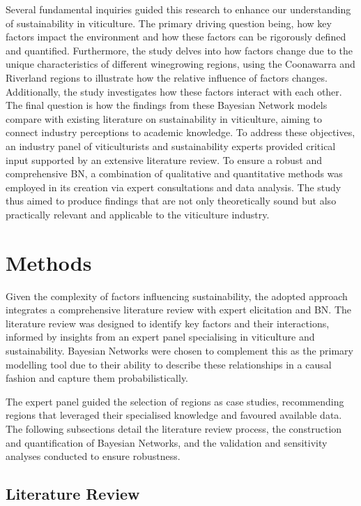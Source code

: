 \documentclass[10pt,letterpaper]{article}
\begin{document}
Several fundamental inquiries guided this research to enhance our understanding of sustainability in viticulture. The primary driving question being, how key factors impact the environment and how these factors can be rigorously defined and quantified. Furthermore, the study delves into how factors change due to the unique characteristics of different winegrowing regions, using the Coonawarra and Riverland regions to illustrate how the relative influence of factors changes. Additionally, the study investigates how these factors interact with each other. The final question is how the findings from these Bayesian Network models compare with existing literature on sustainability in viticulture, aiming to connect industry perceptions to academic knowledge. To address these objectives, an industry panel of viticulturists and sustainability experts provided critical input supported by an extensive literature review. To ensure a robust and comprehensive BN, a combination of qualitative and quantitative methods was employed in its creation via expert consultations and data analysis. The study thus aimed to produce findings that are not only theoretically sound but also practically relevant and applicable to the viticulture industry.

\section*{Methods}

Given the complexity of factors influencing sustainability, the adopted approach integrates a comprehensive literature review with expert elicitation and BN. The literature review was designed to identify key factors and their interactions, informed by insights from an expert panel specialising in viticulture and sustainability. Bayesian Networks were chosen to complement this as the primary modelling tool due to their ability to describe these relationships in a causal fashion and capture them probabilistically.

The expert panel guided the selection of regions as case studies, recommending regions that leveraged their specialised knowledge and favoured available data. The following subsections detail the literature review process, the construction and quantification of Bayesian Networks, and the validation and sensitivity analyses conducted to ensure robustness.

\subsection*{Literature Review}
\end{document}
